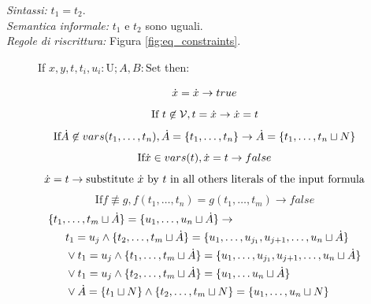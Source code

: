\documentclass[12pt,a4paper,openright]{book} %
\begin{document}
\textit{Sintassi:} $t_1 = t_2$.\\
\noindent\textit{Semantica informale:} $t_1$ e $t_2$ sono uguali.\\
\noindent\textit{Regole di riscrittura:} Figura \ref{fig:eq_constraints}.

\begin{figure}
	\begin{tcolorbox}[colframe=black, colback=white, sharp corners]
		\setcounter{equation}{0}
		\renewcommand{\theequation}{=\textsubscript{\arabic{equation}}}

		If $x, y, t, t_i, u_i: \text{U}; A,B: \text{Set}$ then:

		\begin{equation}
		\dot{x} = \dot{x} \to true
		\end{equation}
		\begin{equation}
		\text{If } t \not\in \mathcal{V}, t = \dot{x} \to \\ \dot{x} = t
		\end{equation}
		\begin{equation}
		\text{If} \dot{A} \not\in vars(t_1, \ldots, t_n), \dot{A} = \{ t_1, \ldots, t_n \} \to \dot{A} = \{ t_1, \ldots, t_n \sqcup N \}
		\end{equation}
		\begin{equation}
		\text{If} \dot{x} \in vars(t), \dot{x} = t \to false
		\end{equation}
		\begin{equation}
		\dot{x} = t \to \text{substitute $\dot{x}$ by $t$ in all others literals of the input formula}
		\end{equation}
		\begin{equation}
		\text{If} f \not\equiv g, f(t_1, \ldots, t_n) = g(t_1, \ldots, t_m) \to false
		\end{equation}
		\begin{equation}
		\begin{split}
		\{ t_1, & \ldots, t_m \sqcup \dotA \} = \{u_1, \ldots, u_n \sqcup \dotA \} \to \\
		& t_1 = u_j \land \{ t_2, \ldots, t_m \sqcup \dotA \} = \{ u_1, \ldots, u_{j_1}, u_{j+1}, \ldots, u_n \sqcup \dotA \} \\
		& \lor t_1 = u_j \land \{ t_1, \ldots, t_m \sqcup \dotA \} = \{ u_1, \ldots, u_{j_1}, u_{j+1}, \ldots, u_n \sqcup \dotA \} \\
		& \lor t_1 = u_j \land \{ t_2, \ldots, t_m \sqcup \dotA \} = \{ u_1, \ldots u_n \sqcup \dotA \} \\
		& \lor \dotA = \{ t_1 \sqcup N \} \land \{ t_2, \ldots, t_m \sqcup N \} = \{ u_1, \ldots, u_n \sqcup N \}

\end{split}
\end{equation}
\end{tcolorbox}
\end{figure}
\end{document}
